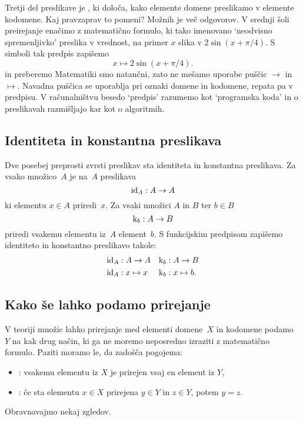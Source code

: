 Tretji del preslikave je , ki določa, kako elemente domene preslikamo v elemente
kodomene. Kaj pravzaprav to pomeni? Možnih je več odgovorov. V srednji šoli preirejanje
enačimo z matematično formulo, ki tako imenovano `neodvisno spremenljivko' preslika v vrednost, na primer $x$ slika v
$2 \sin(x + \pi/4)$. S simboli tak predpis zapišemo
%
\begin{equation*}
  x \mapsto 2 \sin(x + \pi/4).
\end{equation*}
%
in preberemo 
%
Matematiki smo natančni, zato ne mešamo uporabe puščic $\to$ in $\mapsto$. Navadna puščica
se uporablja pri oznaki domene in kodomene, repata pa v predpisu. V računalništvu besedo
`predpis' razumemo kot `programska koda' in o preslikavah razmišljajo kar kot o
algoritmih.

\subsection{Identiteta in konstantna preslikava}
\label{sec:ident-konst-presl}

Dve posebej preprosti zvrsti preslikav sta identiteta in konstantna preslikava.
Za vsako množico~$A$ je  na~$A$ preslikava
%
\begin{equation*}
  \id[A] : A \to A
\end{equation*}
%
ki elementu $x \in A$ priredi~$x$.
%
Za vsaki množici $A$ in $B$ ter $b \in B$ 
%
\begin{equation*}
  \konst{b} : A \to B
\end{equation*}
%
priredi vsakemu elementu iz~$A$ element~$b$.
%
S funkcijskim predpisom zapišemo identiteto in konstantno preslikavo takole:
%
\begin{align*}
  \id[A] &: A \to A
  &
  \konst{b} &: A \to B
  \\
  \id[A] &: x \mapsto x
  &
  \konst{b} &: x \mapsto b.
\end{align*}

\subsection{Kako še lahko podamo prirejanje}
\label{sec:drugi-nacin-prirejanje}

V teoriji množic lahko prirejanje med elementi domene~$X$ in kodomene podamo~$Y$ na kak drug način, ki ga ne moremo neposredno izraziti z matematično formulo. Paziti moramo le, da zadošča pogojema:
%
\begin{itemize}
\item {}: vsakemu elementu iz $X$ je prirejen vsaj en element iz $Y$,
\item {}: če sta elementu $x \in X$ prirejena $y \in Y$ in $z \in Y$, potem $y = z$.
\end{itemize}
%
Obravnavajmo nekaj zgledov.

